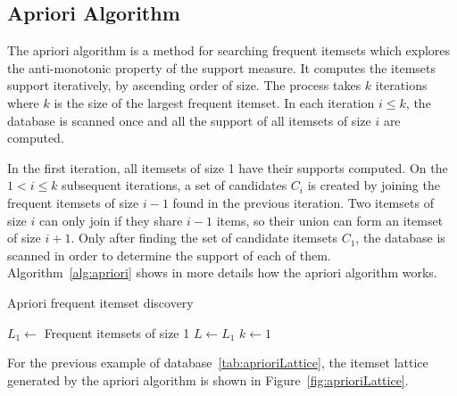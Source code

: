 \subsection{Apriori Algorithm}
The apriori algorithm is a method for searching frequent itemsets which explores the anti-monotonic property of the
support measure. It computes the itemsets support iteratively, by ascending order of size. The
process takes $k$ iterations where $k$ is the size of the largest frequent itemset. In each iteration $i \leq k$, the
database is scanned once and all the support of all itemsets of size $i$ are computed.

In the first iteration, all itemsets of size 1 have their supports computed. On the $1 < i \leq k$ subsequent
iterations, a set of candidates $C_i$ is created by joining the frequent itemsets of size $i-1$ found in the previous
iteration. Two itemsets of size $i$ can only join if they share $i-1$ items, so their union can form an itemset of
size
$i+1$. Only after finding the set of candidate itemsets $C_1$, the database is scanned in order to determine the
support of each of them. Algorithm~\ref{alg:apriori} shows in more details how the apriori algorithm works.

\begin{algorithm}[h!]
  \caption{Apriori frequent itemset discovery}
  \label{alg:apriori}

  $L_1 \leftarrow$ Frequent itemsets of size 1 \;
  $L \leftarrow L_1$ \;
  $k \leftarrow 1$ \;
   \;
\end{algorithm}

For the previous example of database~\ref{tab:aprioriLattice}, the itemset lattice generated by the apriori algorithm
is shown in Figure~\ref{fig:aprioriLattice}. 


